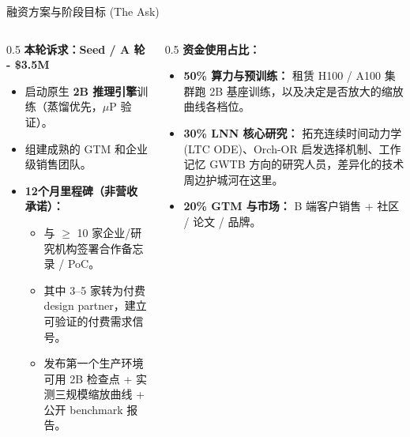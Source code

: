 ﻿\documentclass[aspectratio=169, 10pt]{beamer}
\begin{document}
\begin{frame}{融资方案与阶段目标 (The Ask)}
\begin{columns}
\begin{column}{0.5\textwidth}
\textbf{本轮诉求：Seed / A 轮 - \$3.5M}
\vspace{0.5em}
\begin{itemize}
    \item 启动原生 \textbf{2B 推理引擎}训练（蒸馏优先，$\mu$P 验证）。
    \item 组建成熟的 GTM 和企业级销售团队。
    \item \textbf{12个月里程碑（非营收承诺）：}
    \begin{itemize}\footnotesize
        \item 与 $\geq$ 10 家企业/研究机构签署合作备忘录 / PoC。
        \item 其中 3--5 家转为付费 design partner，建立可验证的付费需求信号。
        \item 发布第一个生产环境可用 2B 检查点 + 实测三规模缩放曲线 + 公开 benchmark 报告。
    \end{itemize}
\end{itemize}
\end{column}
\begin{column}{0.5\textwidth}
\textbf{资金使用占比：}
\begin{itemize}
    \item \textbf{50\% 算力与预训练：} 租赁 H100 / A100 集群跑 2B 基座训练，以及决定是否放大的缩放曲线各档位。
    \item \textbf{30\% LNN 核心研究：} 拓充连续时间动力学 (LTC ODE)、Orch-OR 启发选择机制、工作记忆 GWTB 方向的研究人员，差异化的技术周边护城河在这里。
    \item \textbf{20\% GTM 与市场：} B 端客户销售 + 社区 / 论文 / 品牌。
\end{itemize}
\end{column}
\end{columns}
\end{frame}
\end{document}
